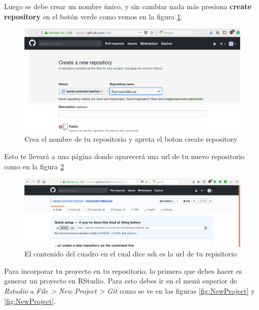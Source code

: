 \documentclass[]{book}
\begin{document}
Luego se debe crear un nombre único, y sin cambiar nada más presiona
\textbf{create repository} en el botón verde como vemos en la figura
\ref{fig:Name}.

\begin{figure}

{\centering \includegraphics[width=0.8\linewidth]{NombreRepo} 

}

\caption{Crea el nombre de tu repositorio y apreta el boton create repository}\label{fig:Name}
\end{figure}

Esto te llevará a una página donde aparecerá una url de tu nuevo
repositorio como en la figura \ref{fig:ssh}

\begin{figure}

{\centering \includegraphics[width=0.8\linewidth]{GitAdress} 

}

\caption{El contenido del cuadro en el cual dice ssh es la url de tu repisitorio}\label{fig:ssh}
\end{figure}

Para incorporar tu proyecto en tu repositorio, lo primero que debes
hacer es generar un proyecto en RStudio. Para esto debes ir en el menú
superior de \emph{Rstudio} a \emph{File \textgreater{} New Project
\textgreater{} Git} como se ve en las figuras \ref{fig:NewProject} y
\ref{fig:NewProject}.
\end{document}

